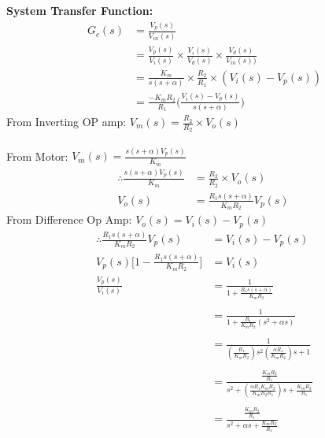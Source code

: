 \documentclass[11pt,a4paper]{article}
\begin{document}
\begin{enumerate}
\pagebreak
\textbf{System Transfer Function:}\\
	\begin{align*}
	G_{c}(s) &= \frac{V_p(s)}{V_{in}(s)}\\ 
	&= \frac{V_p(s)}{V_i(s)}\times\frac{V_i(s)}{V_d(s)}\times\frac{V_d(s)}{V_{in}(s))}\\
	&= \frac{K_m}{s(s+\alpha)}\times\frac{R_2}{R_1}\times(V_i(s)-V_p(s))\\
	&=\frac{-K_m R_2}{R_1}\bigg(\frac{V_i(s)-V_p(s)}{s(s+\alpha)}\bigg)
	\end{align*}
From Inverting OP amp: $V_m(s) = \frac{R_2}{R_2}\times V_o(s)$\\\\
From Motor: $V_m(s) = \frac{s(s+\alpha)V_p(s)}{K_m}$
	\begin{align*}
	\therefore\frac{s(s+\alpha)V_p(s)}{K_m} &= \frac{R_2}{R_2}\times V_o(s)\\	
	V_o(s) &= \frac{R_1s(s+\alpha)}{K_mR_2}V_p(s)	\
	\end{align*}
From Difference Op Amp: $V_o(s) = V_i(s) - V_p(s)$
	\begin{align*}
	\therefore\frac{R_1s(s+\alpha)}{K_mR_2}V_p(s) &= V_i(s) - V_p(s)\\	
	V_p(s)\bigg[1-\frac{R_1s(s+\alpha)}{K_mR_2}\bigg] &= V_i(s)\\
	\frac{V_p(s)}{V_i(s)} &= \frac{1}{1+\frac{R_1s(s+\alpha)}{K_mR_2}}\\\\
	&= \frac{1}{1+\frac{R_1}{K_mR_2}(s^2+\alpha s)}\\\\
	&= \frac{1}{(\frac{R_1}{K_mR_2})s^2(\frac{\alpha R_1}{K_mR_2})s+1}\\\\
	&= \frac{\frac{K_m R_2}{R_1}}{s^2+(\frac{\alpha R_1 K_m R_2}{K_m R_2 R_1})s+\frac{K_m R_2}{R_1}}\\\\
	&= \frac{\frac{K_m R_2}{R_1}}{s^2+\alpha s+\frac{K_m R_2}{R_1}}
	\end{align*}	  


\end{enumerate}
\end{document}
